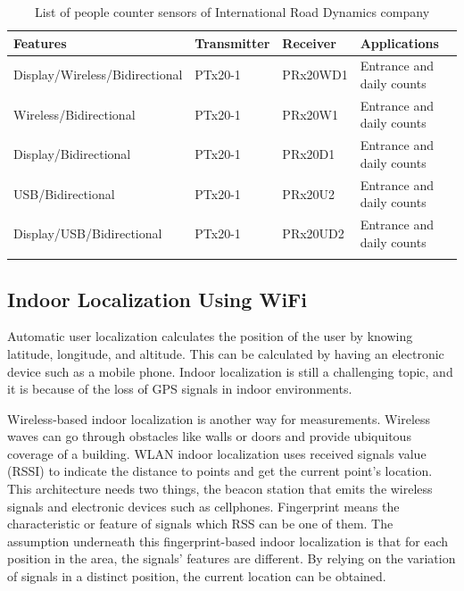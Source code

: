 \begin{table}[!h]{}
\small
\centering
\caption{List of people counter sensors of International Road Dynamics company}%
\begin{tabular}{llll}
\toprule
\textbf{Features} & \textbf{Transmitter} & \textbf{Receiver}  & \textbf{Applications}     \\
\midrule
Display/Wireless/Bidirectional     &  PTx20-1 & PRx20WD1 & Entrance and daily counts\\ 
Wireless/Bidirectional             &  PTx20-1 & PRx20W1  & Entrance and daily counts\\ 
Display/Bidirectional              &  PTx20-1 & PRx20D1  & Entrance and daily counts\\ 
USB/Bidirectional                  &  PTx20-1 & PRx20U2  & Entrance and daily counts\\ 
Display/USB/Bidirectional          &  PTx20-1 & PRx20UD2 & Entrance and daily counts\\ 
\bottomrule
\label{sensor}
\end{tabular}
\end{table}




\subsection{Indoor Localization Using WiFi}

Automatic user localization calculates the position of the user by knowing latitude, longitude, and altitude. This can be calculated by having an electronic device such as a mobile phone. Indoor localization is still a challenging topic, and it is because of the loss of GPS signals in indoor environments.

Wireless-based indoor localization is another way for measurements. Wireless waves can go through obstacles like walls or doors and provide ubiquitous coverage of a building. WLAN indoor localization uses received signals value (RSSI) to indicate the distance to points and get the current point's location.
This architecture needs two things, the beacon station that emits the wireless signals and electronic devices such as cellphones. 
Fingerprint means the characteristic or feature of signals which RSS can be one of them. The assumption underneath this fingerprint-based indoor localization is that for each position in the area, the signals' features are different. By relying on the variation of signals in a distinct position, the current location can be obtained.



